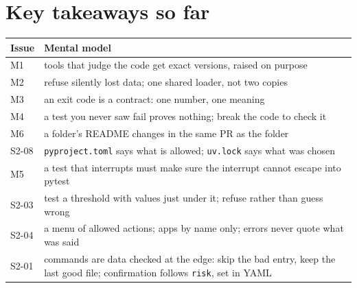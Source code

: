 \documentclass[11pt,a4paper]{article}
\begin{document}
\section{Key takeaways so far}
\begin{center}
\renewcommand{\arraystretch}{1.2}
\begin{tabularx}{\textwidth}{l X}
\toprule
\textbf{Issue} & \textbf{Mental model} \\
\midrule
M1 & tools that judge the code get exact versions, raised on purpose \\
M2 & refuse silently lost data; one shared loader, not two copies \\
M3 & an exit code is a contract: one number, one meaning \\
M4 & a test you never saw fail proves nothing; break the code to check it \\
M6 & a folder's README changes in the same PR as the folder \\
S2-08 & \texttt{pyproject.toml} says what is allowed; \texttt{uv.lock} says what was chosen \\
M5 & a test that interrupts must make sure the interrupt cannot escape into pytest \\
S2-03 & test a threshold with values just under it; refuse rather than guess wrong \\
S2-04 & a menu of allowed actions; apps by name only; errors never quote what was said \\
S2-01 & commands are data checked at the edge: skip the bad entry, keep the last good file; confirmation follows \texttt{risk}, set in YAML \\
\bottomrule
\end{tabularx}
\end{center}

\end{document}
